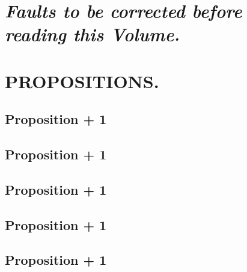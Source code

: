 		\newpage
		{\centering\section[CORRIGENDA.]{\textit{Faults to be corrected before reading this Volume.}}
		\label{section\thesection}}
		\clearpage
        \setcounter{page}{1}
		{\centering\section{PROPOSITIONS.}
		\label{section\thesection}}

		\subsection{Proposition \the\numexpr \theprop + 1}
		
		\clearpage
		\subsection{Proposition \the\numexpr \theprop + 1}
		
		\clearpage
		\subsection{Proposition \the\numexpr \theprop + 1}
		
		\clearpage
		\subsection{Proposition \the\numexpr \theprop + 1}
		
		\clearpage
		\subsection{Proposition \the\numexpr \theprop + 1}
		
		\clearpage
